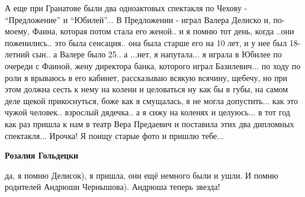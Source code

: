 \begin{itemize}

А еще при Гранатове были два одноактовых спектакля по Чехову - \enquote{Предложение} и
\enquote{Юбилей}... В Предложении - играл Валера Делиско и, по\hyp моему, Фаина, которая
потом стала его женой.. и я помню тот день, когда ..они поженились.. это была
сенсация.. она была старше его на 10 лет, и у нее был 18-летний сын.. а Валере
было 25.. а ...нет, я напутала... я играла в Юбилее по очереди с Фаиной, жену
директора банка, которого играл Базилевич... по ходу по роли я врываюсь в его
кабинет, рассказываю всякую всячину, щебечу, но при этом должна сесть к нему на
колени и целоваться ну как бы в губы, на самом деле щекой прикоснуться, боже
как я смущалась, я не могла допустить... как это чужой человек.. взрослый
дядечка.. а я сижу на коленях и целуюсь... в тот год как раз пришла к нам в театр
Вера Предаевич и поставила этих два дипломных спектакля... Ирочка! Я поищу
старые фото и пришлю тебе...

\textbf{Розалия Гольдецки} 

да, я помню Делисок), я пришла, они ещё немного были и ушли. И помню родителей
Андрюши Чернышова). Андрюша теперь звезда!

\end{itemize} %
